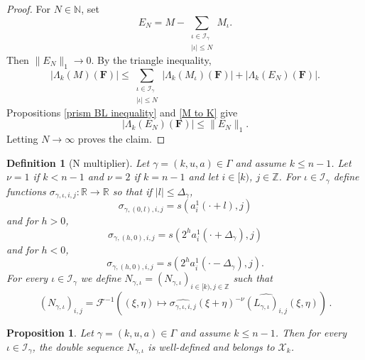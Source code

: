 \documentclass[12pt,reqno]{amsart}
\theoremstyle{plain}
\newtheorem{proposition}[theorem]{Proposition}
\newtheorem{definition}[theorem]{Definition}
\numberwithin{equation}{section}
\theoremstyle{remark}
\newcommand{\using}[1]{}
\newcommand{\Z}{{\mathbb Z}}
\newcommand{\R}{{\mathbb R}}
\newcommand{\N}{{\mathbb N}}
\begin{document}
\begin{proof}
For $N\in\N$, set
\[
E_N=M-\sum_{\substack{\iota\in\mathcal I_\gamma\\|\iota|\le N}}M_\iota.
\]
Then $\|E_N\|_1\to0$. By the triangle inequality,
\[
|\Lambda_k(M)(\mathbf F)|
\le
\sum_{\substack{\iota\in\mathcal I_\gamma\\|\iota|\le N}}
|\Lambda_k(M_\iota)(\mathbf F)|
+|\Lambda_k(E_N)(\mathbf F)|.
\]
Propositions \ref{prism BL inequality} and \ref{M to K} give
\[
|\Lambda_k(E_N)(\mathbf F)|\le\|E_N\|_1.
\]
Letting $N\to\infty$ proves the claim.
\end{proof}


\begin{definition}[N multiplier]\label{N multiplier}
  Let $\gamma=(k,u,a)\in \Gamma$ and assume $k\le n-1$.
Let $\nu=1$ if $k<n-1$ and $\nu=2$ if $k=n-1$ and let $i\in [k)$, $j\in \Z$.
For $\iota\in\mathcal{I}_{\gamma}$ define functions $\sigma_{\gamma,\iota,i,j}:\R\to\R$ so that
if $|l|\le \Delta_{\gamma}$,
\begin{equation}\label{auto:sigma-central-band} \sigma_{\gamma,(0,l),i,j} = s(a_i^1(\cdot+l), j) \end{equation}
and for $h>0$,
\begin{equation}\label{auto:sigma-positive-band} \sigma_{\gamma,(h,0),i,j} = s(2^h a_i^1(\cdot+\Delta_{\gamma}), j) \end{equation}
and for $h<0$,
\begin{equation}\label{auto:sigma-negative-band} \sigma_{\gamma,(h,0),i,j} = s(2^h a_i^1(\cdot-\Delta_{\gamma}), j). \end{equation}
For every $\iota\in\mathcal{I}_{\gamma}$ we define $N_{\gamma,\iota}= (N_{\gamma,\iota})_{i\in [k),j\in \Z}$ such that
\begin{equation}\label{auto:N-kernel-definition}
 (N_{\gamma,\iota})_{i,j} =
 \mathcal F^{-1}((\xi,\eta) \mapsto \widehat{\sigma_{\gamma,\iota,i,j}}(\xi+\eta)^{-\nu}\widehat{(L_{\gamma,\iota})_{i,j}}(\xi,\eta))\, .
\end{equation}
\end{definition}

\begin{proposition}\label{auto:N-kernel-well-definedness}\using{four scale Gaussian kernel}\using{H-in-X}\using{convolution vector}
Let $\gamma=(k,u,a)\in \Gamma$ and assume $k\le n-1$. Then for every $\iota\in\mathcal{I}_{\gamma}$, the double sequence $N_{\gamma,\iota}$ is well-defined and belongs to $\mathcal{X}_k$.
\end{proposition}
\end{document}
